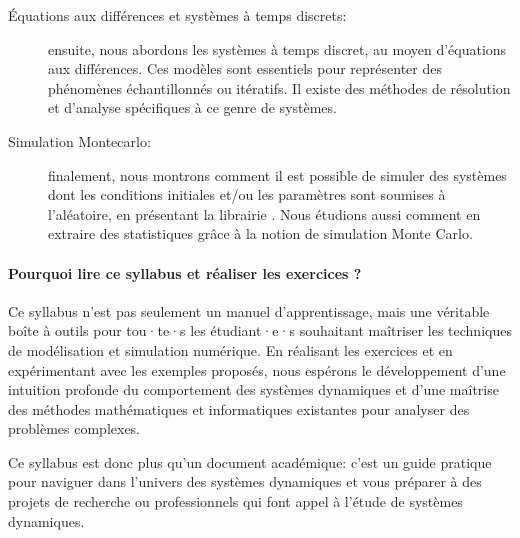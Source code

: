 \begin{description}
        \item[Équations aux différences et systèmes à temps discrets:] ensuite, nous abordons  les systèmes à temps discret, au moyen d'équations aux différences. Ces modèles sont essentiels pour représenter des phénomènes échantillonnés ou itératifs.  Il existe des méthodes de résolution et d'analyse spécifiques à ce genre de systèmes.
        \item[Simulation Montecarlo:] finalement, nous montrons comment il est possible de simuler des systèmes dont les conditions initiales et/ou les paramètres sont soumises à l'aléatoire, en présentant la librairie . Nous étudions aussi comment en extraire des statistiques grâce à la notion de simulation Monte Carlo.
    \end{description}

    \paragraph{Pourquoi lire ce syllabus et réaliser les exercices ?}
    
    Ce syllabus n'est pas seulement un manuel d'apprentissage, mais une véritable boîte à outils pour tou·te·s les étudiant·e·s souhaitant maîtriser les techniques de modélisation et simulation numérique. En réalisant les exercices et en expérimentant avec les exemples proposés, nous espérons le développement d'une intuition profonde du comportement des systèmes dynamiques et d'une maîtrise des méthodes mathématiques et informatiques existantes pour analyser des problèmes complexes. 

    Ce syllabus est donc plus qu’un document académique: c’est un guide pratique pour naviguer dans l’univers des systèmes dynamiques et vous préparer à des projets de recherche ou professionnels qui font appel à l'étude de systèmes dynamiques.
